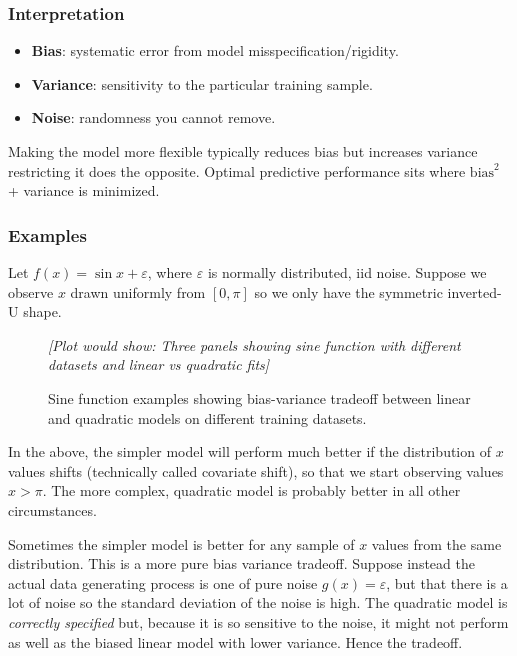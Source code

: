 \subsubsection{Interpretation}

\begin{itemize}
\item \textbf{Bias}: systematic error from model misspecification/rigidity.
\item \textbf{Variance}: sensitivity to the particular training sample.
\item \textbf{Noise}: randomness you cannot remove.
\end{itemize}

Making the model more flexible typically reduces bias but increases variance restricting it does the opposite. Optimal predictive performance sits where $\mathrm{bias}^2$ + variance is minimized.

\subsubsection{Examples}

Let $f(x) = \sin x + \varepsilon$, where $\varepsilon$ is normally distributed, iid noise. Suppose we observe $x$ drawn uniformly from $[0,\pi]$ so we only have the symmetric inverted-U shape.

\begin{figure}[H]
\centering
\textit{[Plot would show: Three panels showing sine function with different datasets and linear vs quadratic fits]}
\caption{Sine function examples showing bias-variance tradeoff between linear and quadratic models on different training datasets.}
\end{figure}

In the above, the simpler model will perform much better if the distribution of $x$ values shifts (technically called covariate shift), so that we start observing values $x>\pi$. The more complex, quadratic model is probably better in all other circumstances.

Sometimes the simpler model is better for any sample of $x$ values from the same distribution. This is a more pure bias variance tradeoff. Suppose instead the actual data generating process is one of pure noise $g(x) = \varepsilon$, but that there is a lot of noise so the standard deviation of the noise is high. The quadratic model is \textit{correctly specified} but, because it is so sensitive to the noise, it might not perform as well as the biased linear model with lower variance. Hence the tradeoff.

